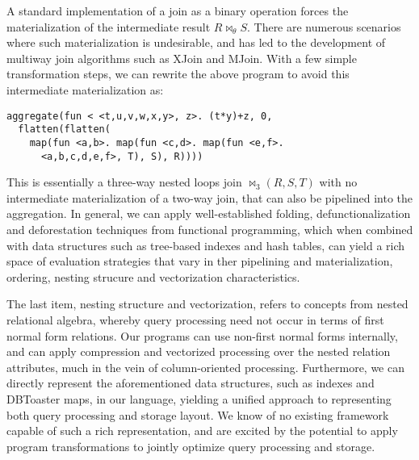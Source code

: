 A standard implementation of a join as a binary operation forces the
materialization of the intermediate result $R \bowtie_{\theta} S$. There are
numerous scenarios where such materialization is undesirable, and has led to the
development of multiway join algorithms such as XJoin and MJoin. With a few
simple transformation steps, we can rewrite the above program to avoid this
intermediate materialization as:

\begin{verbatim}
aggregate(fun < <t,u,v,w,x,y>, z>. (t*y)+z, 0,
  flatten(flatten(
    map(fun <a,b>. map(fun <c,d>. map(fun <e,f>.
      <a,b,c,d,e,f>, T), S), R))))
\end{verbatim}

This is essentially a three-way nested loops join $\bowtie_3(R,S,T)$ with no
intermediate materialization of a two-way join, that can also be pipelined into
the aggregation. In general, we can apply well-established folding,
defunctionalization and deforestation techniques from functional programming,
which when combined with data structures such as tree-based indexes and hash
tables, can yield a rich space of evaluation strategies that vary in ther
pipelining and materialization, ordering, nesting strucure and vectorization
characteristics.

The last item, nesting structure and vectorization, refers to concepts from
nested relational algebra, whereby query processing need not occur in terms of
first normal form relations. Our programs can use non-first normal forms
internally, and can apply compression and vectorized processing over the nested
relation attributes, much in the vein of column-oriented processing.
Furthermore, we can directly represent the aforementioned data structures, such
as indexes and DBToaster maps, in our language, yielding a unified approach to
representing both query processing and storage layout. We know of no existing
framework capable of such a rich representation, and are excited by the
potential to apply program transformations to jointly optimize query processing
and storage.


